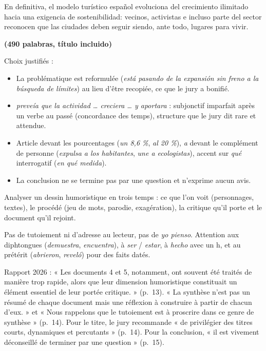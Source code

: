 \documentclass[11pt,a4paper]{article}
\providecommand{\tightlist}{\setlength{\itemsep}{0pt}\setlength{\parskip}{0pt}}
\begin{document}
En definitiva, el modelo turístico español evoluciona del crecimiento ilimitado hacia una exigencia de sostenibilidad: vecinos, activistas e incluso parte del sector reconocen que las ciudades deben seguir siendo, ante todo, lugares para vivir.

\textbf{(490 palabras, título incluido)}

Choix justifiés :

\begin{itemize}
\tightlist
\item
  La problématique est reformulée (\emph{está pasando de la expansión sin freno a la búsqueda de límites}) au lieu d'être recopiée, ce que le jury a bonifié.
\item
  \emph{preveía que la actividad \ldots{} creciera \ldots{} y aportara} : subjonctif imparfait après un verbe au passé (concordance des temps), structure que le jury dit rare et attendue.
\item
  Article devant les pourcentages (\emph{un 8,6 \%}, \emph{al 20 \%}), \emph{a} devant le complément de personne (\emph{expulsa a los habitantes}, \emph{une a ecologistas}), accent sur \emph{qué} interrogatif (\emph{en qué medida}).
\item
  La conclusion ne se termine pas par une question et n'exprime aucun avis.
\end{itemize}

\begin{methode}

Analyser un dessin humoristique en trois temps : ce que l'on voit (personnages, textes), le procédé (jeu de mots, parodie, exagération), la critique qu'il porte et le document qu'il rejoint.

\end{methode}

\begin{piege}

Pas de tutoiement ni d'adresse au lecteur, pas de \emph{yo pienso}. Attention aux diphtongues (\emph{demuestra}, \emph{encuentra}), à \emph{ser} / \emph{estar}, à \emph{hecho} avec un h, et au prétérit (\emph{abrieron}, \emph{reveló}) pour des faits datés.

\end{piege}

\begin{jury}

Rapport 2026 : « Les documents 4 et 5, notamment, ont souvent été traités de manière trop rapide, alors que leur dimension humoristique constituait un élément essentiel de leur portée critique. » (p.~13). « La synthèse n'est pas un résumé de chaque document mais une réflexion à construire à partir de chacun d'eux. » et « Nous rappelons que le tutoiement est à proscrire dans ce genre de synthèse » (p.~14). Pour le titre, le jury recommande « de privilégier des titres courts, dynamiques et percutants » (p.~14). Pour la conclusion, « il est vivement déconseillé de terminer par une question » (p.~15).

\end{jury}
\end{document}

